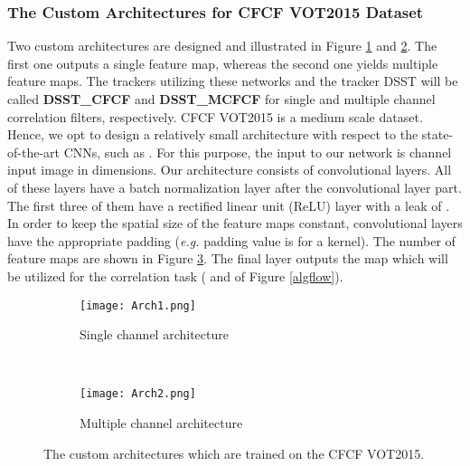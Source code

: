 \documentclass[journal]{IEEEtran}
\begin{document}
\subsubsection{The Custom Architectures for CFCF VOT2015 Dataset}
Two custom architectures are designed and illustrated in Figure \ref{Arch1} and \ref{Arch2}. The first one outputs a single feature map, whereas the second one yields multiple feature maps. The trackers utilizing these networks and the tracker DSST \cite{DSST} will be called \textbf{DSST\_CFCF} and \textbf{DSST\_MCFCF} for single and multiple channel correlation filters, respectively. CFCF VOT2015 is a medium scale dataset. Hence, we opt to design a relatively small architecture with respect to the state-of-the-art CNNs, such as \cite{VGG}. For this purpose, the input to our network is  channel input image in  dimensions. Our architecture consists of  convolutional layers. All of these layers have a batch normalization layer after the convolutional layer part. The first three of them have a rectified linear unit (ReLU) \cite{ImageNetCNN} layer with a leak of  \cite{prelu, prelu2}. In order to keep the spatial size of the feature maps constant, convolutional layers have the appropriate padding (\emph{e.g.} padding value is  for a  kernel). The number of feature maps are shown in Figure \ref{ourarch}. The final layer outputs the map which will be utilized for the correlation task ( and  of Figure \ref{algflow}).
\begin{figure}
\begin{subfigure}{1\linewidth}
  \centering
  \texttt{[image: Arch1.png]}
  \caption{Single channel architecture}
  \label{Arch1}
\end{subfigure}\\
\begin{subfigure}{1.0\linewidth}
  \centering
  \texttt{[image: Arch2.png]}
  \caption{Multiple channel architecture}
  \label{Arch2}
\end{subfigure}
\caption{The custom architectures which are trained on the CFCF VOT2015.}
\label{ourarch}
\end{figure}
\end{document}

